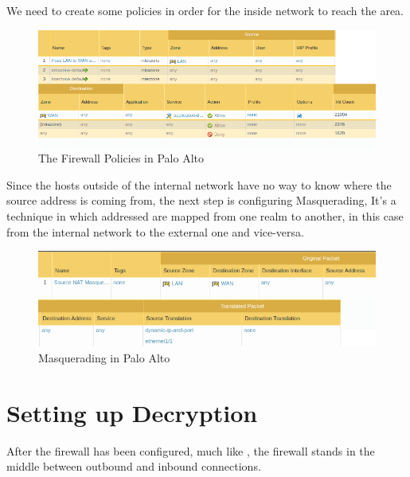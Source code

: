We need to create some policies in order for the inside network to reach the  area.

\begin{figure}[!hb]
 \centering
 \includegraphics[width=13cm]{img/Firewall_Policy.png}
 \caption{The Firewall Policies in Palo Alto }
 \label{Firewall Policies}
\end{figure}


Since the hosts outside of the internal network have no way to know where the source address is coming from, the next step is configuring  Masquerading, It's a technique in which  addressed are mapped from one realm to another, in this case from the internal network to the external one and vice-versa\cite{rfc2663}.

\begin{figure}[!hb]
 \centering
 \includegraphics[width=13cm]{img/NAT_Masquerade.png}
 \caption{ Masquerading in Palo Alto }
 \label{NAT Masquerade}
\end{figure}


\newpage

\section{Setting up Decryption}

After the firewall has been configured, much like , the firewall stands in the middle between outbound and inbound connections.

